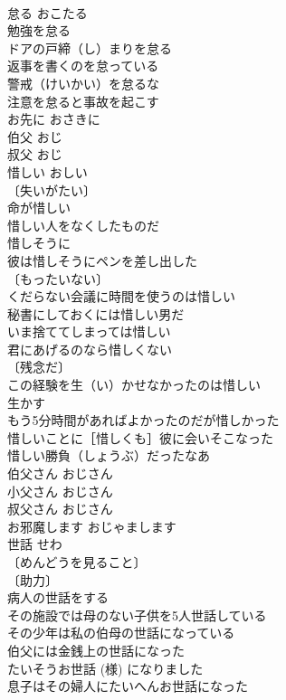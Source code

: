 \documentclass[8pt]{extreport}
\begin{document}
\begin{CJK}{UTF8}{min}
\\	怠る	おこたる	
\\	勉強を怠る 
\\	ドアの戸締（し）まりを怠る 
\\	返事を書くのを怠っている 
\\	警戒（けいかい）を怠るな 
\\	注意を怠ると事故を起こす 
\\	お先に	おさきに	
\\	伯父	おじ	
\\	叔父	おじ	
\\	惜しい	おしい	
\\	〔失いがたい〕　
\\	命が惜しい 
\\	惜しい人をなくしたものだ 
\\	惜しそうに 
\\	彼は惜しそうにペンを差し出した 
\\	〔もったいない〕　
\\	くだらない会議に時間を使うのは惜しい 
\\	秘書にしておくには惜しい男だ 
\\	いま捨ててしまっては惜しい 
\\	君にあげるのなら惜しくない 
\\	〔残念だ〕　
\\	この経験を生（い）かせなかったのは惜しい 
\\	生かす　
\\	もう5分時間があればよかったのだが惜しかった 
\\	惜しいことに［惜しくも］彼に会いそこなった 
\\	惜しい勝負（しょうぶ）だったなあ 
\\	伯父さん	おじさん	
\\	小父さん	おじさん	
\\	叔父さん	おじさん	
\\	お邪魔します	おじゃまします	
\\	世話	せわ	
\\	〔めんどうを見ること〕
\\	〔助力〕
\\	病人の世話をする 
\\	その施設では母のない子供を5人世話している 
\\	その少年は私の伯母の世話になっている 
\\	伯父には金銭上の世話になった 
\\	たいそうお世話 (様) になりました 
\\	息子はその婦人にたいへんお世話になった 

\end{CJK}
\end{document}
